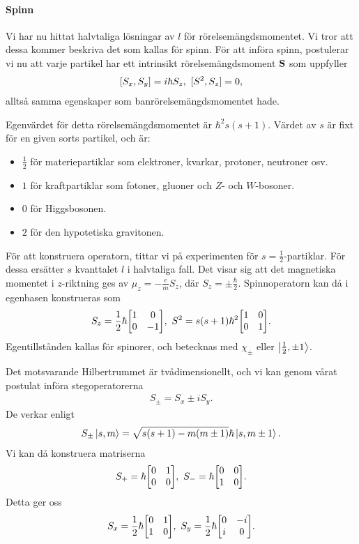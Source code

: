 \paragraph{Spinn}
Vi har nu hittat halvtaliga lösningar av $l$ för rörelsemängdsmomentet. Vi tror att dessa kommer beskriva det som kallas för spinn. För att införa spinn, postulerar vi nu att varje partikel har ett intrinsikt rörelsemängdsmoment $\vb{S}$ som uppfyller
\begin{align*}
	[S_{x}, S_{y}] = i\hbar S_{z},\ [S^{2}, S_{z}] = 0,
\end{align*}
alltså samma egenskaper som banrörelsemängdsmomentet hade.

Egenvärdet för detta rörelsemängdsmomentet är $\hbar^{2}s(s + 1)$. Värdet av $s$ är fixt för en given sorts partikel, och är:
\begin{itemize}
	\item $\frac{1}{2}$ för materiepartiklar som elektroner, kvarkar, protoner, neutroner osv.
	\item $1$ för kraftpartiklar som fotoner, gluoner och $Z$- och $W$-bosoner.
	\item $0$ för Higgsbosonen.
	\item $2$ för den hypotetiska gravitonen.
\end{itemize}

För att konstruera operatorn, tittar vi på experimenten för $s = \frac{1}{2}$-partiklar. För dessa ersätter $s$ kvanttalet $l$ i halvtaliga fall. Det visar sig att det magnetiska momentet i $z$-riktning ges av $\mu_{z} = -\frac{e}{m}S_{z}$, där $S_{z} = \pm\frac{\hbar}{2}$. Spinnoperatorn kan då i egenbasen konstrueras som
\begin{align*}
	S_{z} = \frac{1}{2}\hbar
	\mqty[
		1 & 0 \\
		0 & -1
	],\
	S^{2} = s(s + 1)\hbar^{2}
	\mqty[
		1 & 0 \\
		0 & 1
	].
\end{align*}
Egentillstånden kallas för spinorer, och betecknas med $\chi_{\pm}$ eller $\ket{\frac{1}{2}, \pm 1}$.

Det motsvarande Hilbertrummet är tvådimensionellt, och vi kan genom vårat postulat införa stegoperatorerna
\begin{align*}
	S_{\pm} = S_{x} \pm iS_{y}.
\end{align*}
De verkar enligt
\begin{align*}
	S_{\pm}\ket{s, m} = \sqrt{s(s + 1) - m(m \pm 1)}\hbar\ket{s, m \pm 1}.
\end{align*}
Vi kan då konstruera matriserna
\begin{align*}
	S_{+} = \hbar
	\mqty[
		0 & 1 \\
		0 & 0
	],\
	S_{-} = \hbar
	\mqty[
		0 & 0 \\
		1 & 0
	].
\end{align*}
Detta ger oss
\begin{align*}
	S_{x} = \frac{1}{2}\hbar
	\mqty[
		0 & 1 \\
		1 & 0
	],\ 
	S_{y} = \frac{1}{2}\hbar
	\mqty[
		0 & -i \\
		i & 0
	].
\end{align*}

